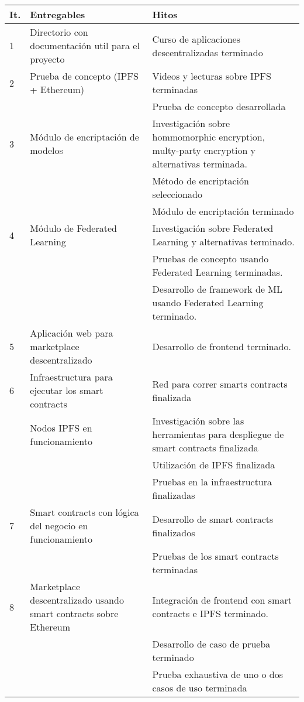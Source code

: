 \documentclass[
11pt, %
oneside, %
spanish, %
singlespacing, %
headsepline, %
chapterinoneline, %
]{MastersDoctoralThesis} %
\begin{document}
{
\setlength{\extrarowheight}{.2em}
\begin{center}
	\begin{tabularx}{\textwidth}{|l|X|X|}
    \hline
    \textbf{It.} & \textbf{Entregables} & \textbf{Hitos}  \\ \hline
    1 & Directorio con documentación util para el proyecto & Curso de aplicaciones descentralizadas terminado \cite{course1} \cite{course2} \\ \hline
    2 & Prueba de concepto (IPFS + Ethereum) & Videos y lecturas sobre IPFS terminadas \\
      & & Prueba de concepto desarrollada  \\ \hline
    3 & Módulo de encriptación de modelos & Investigación sobre hommomorphic encryption, multy-party encryption y alternativas terminada. \\ 
      & & Método de encriptación seleccionado \\
      & & Módulo de encriptación terminado \\ \hline
    4 & Módulo de Federated Learning & Investigación sobre Federated Learning y alternativas terminado. \\ 
      & & Pruebas de concepto usando Federated Learning terminadas. \\
      & & Desarrollo de framework de ML usando Federated Learning terminado. \\ \hline
    5 & Aplicación web para marketplace descentralizado & Desarrollo de frontend terminado. \\ \hline
    6 & Infraestructura para ejecutar los smart contracts & Red para correr smarts contracts finalizada \\
      & Nodos IPFS en funcionamiento & Investigación sobre las herramientas para despliegue de smart contracts finalizada \\ 
      & & Utilización de IPFS finalizada \\ 
      & & Pruebas en la infraestructura finalizadas\\ \hline
    7 & Smart contracts con lógica del negocio en funcionamiento & Desarrollo de smart contracts finalizados \\ 
      & & Pruebas de los smart contracts terminadas \\ \hline
    8 & Marketplace descentralizado usando smart contracts sobre Ethereum & Integración de frontend con smart contracts e IPFS terminado. \\
      & & Desarrollo de caso de prueba terminado \\
      & & Prueba exhaustiva de uno o dos casos de uso terminada \\ \hline
    \end{tabularx}
\end{center}
}
\end{document}
